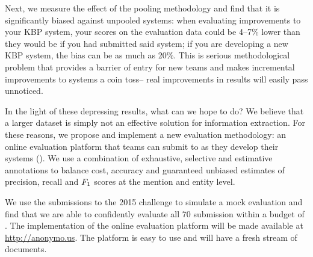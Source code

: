 Next, we measure the effect of the pooling methodology  and find that it is significantly biased against unpooled systems: when evaluating improvements to your KBP system, your scores on the evaluation data could be 4--7\% lower than they would be if you had submitted said system; if you are developing a new KBP system, the bias can be as much as 20\%.
This is serious methodological problem that provides a barrier of entry for new teams and makes incremental improvements to systems a coin toss-- real improvements in results will easily pass unnoticed. 


In the light of these depressing  results, what can we hope to do?
We believe that a larger dataset is simply not an effective solution for information extraction. 
For these reasons, we propose and implement a new evaluation methodology: an online evaluation platform that teams can submit to as they develop their systems ().
We use a combination of exhaustive, selective and estimative annotations to balance cost, accuracy and guaranteed unbiased estimates of precision, recall and $F_1$ scores at the mention and entity level.

We use the submissions to the 2015 challenge to simulate a mock evaluation and find that we are able to confidently evaluate all 70 submission within a budget of .
The implementation of the online evaluation platform will be made available at \url{http://anonymo.us}.
The platform is easy to use and will have a fresh stream of documents.
\cite{chaganty2016perspectives}
